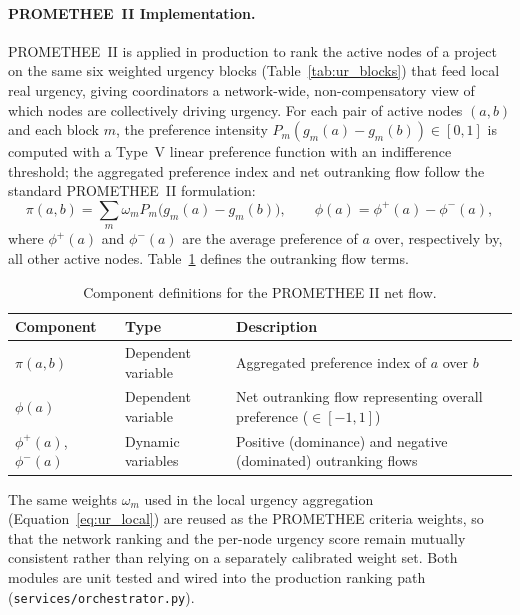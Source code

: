 \paragraph{PROMETHEE~II Implementation.}
PROMETHEE~II is applied in production to rank the active nodes of a project on the same six
weighted urgency blocks (Table~\ref{tab:ur_blocks}) that feed local real urgency, giving
coordinators a network-wide, non-compensatory view of which nodes are collectively driving
urgency. For each pair of active nodes $(a,b)$ and each block $m$, the preference intensity
$P_m(g_m(a) - g_m(b)) \in [0,1]$ is computed with a Type~V linear preference function with an
indifference threshold; the aggregated preference index and net outranking flow follow the
standard PROMETHEE~II formulation:
\begin{equation}
    \pi(a,b) = \sum_m \omega_m P_m\bigl(g_m(a) - g_m(b)\bigr), \qquad \phi(a) = \phi^+(a) - \phi^-(a),
    \label{eq:promethee_net}
\end{equation}
where $\phi^+(a)$ and $\phi^-(a)$ are the average preference of $a$ over, respectively by, all
other active nodes. Table~\ref{tab:promethee_net_components} defines the outranking flow terms.

\begin{table}[H]
\centering
\caption{Component definitions for the PROMETHEE II net flow.}
\label{tab:promethee_net_components}
\small
\begin{tabularx}{\linewidth}{llX}
\toprule
\textbf{Component} & \textbf{Type} & \textbf{Description} \\
\midrule
$\pi(a,b)$ & Dependent variable & Aggregated preference index of $a$ over $b$ \\
$\phi(a)$ & Dependent variable & Net outranking flow representing overall preference ($\in [-1, 1]$) \\
$\phi^+(a)$, $\phi^-(a)$ & Dynamic variables & Positive (dominance) and negative (dominated) outranking flows \\
\bottomrule
\end{tabularx}
\end{table}

The same weights $\omega_m$ used in the local urgency aggregation (Equation~\ref{eq:ur_local}) are
reused as the PROMETHEE criteria weights, so that the network ranking and the per-node urgency
score remain mutually consistent rather than relying on a separately calibrated weight set.
Both modules are unit tested and wired into the production ranking path
(\texttt{services/}\allowbreak\texttt{orchestrator.py}).

